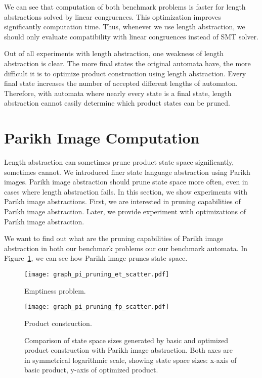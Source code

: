 We can see that computation of both benchmark problems is faster for length abstractions solved by linear congruences. This optimization improves significantly computation time. Thus, whenever we use length abstraction, we should only evaluate compatibility with linear congruences instead of SMT solver.

Out of all experiments with length abstraction, one weakness of length abstraction is clear. The more final states the original automata have, the more difficult it is to optimize product construction using length abstraction. Every final state increases the number of accepted different lengths of automaton. Therefore, with automata where nearly every state is a final state, length abstraction cannot easily determine which product states can be pruned.

\section{Parikh Image Computation}

Length abstraction can sometimes prune product state space significantly, sometimes cannot. We introduced finer state language abstraction using Parikh images. Parikh image abstraction should prune state space more often, even in cases where length abstraction fails. In this section, we show experiments with Parikh image abstractions. First, we are interested in pruning capabilities of Parikh image abstraction. Later, we provide experiment with optimizations of Parikh image abstraction.

We want to find out what are the pruning capabilities of Parikh image abstraction in both our benchmark problems our our benchmark automata. In Figure~\ref{fig:graph:pi_product_state_space_sizes_pruning_cap}, we can see how Parikh image prunes state space.
\begin{figure}[ht]
    \centering
    \begin{minipage}{0.49\linewidth}
        \centering
        \texttt{[image: graph\_pi\_pruning\_et\_scatter.pdf]}
        \caption{Emptiness problem.}
        \label{fig:graph:pi_et_state_space_sizes_comp}
    \end{minipage}
    \hfill
    \begin{minipage}{0.49\linewidth}
        \centering
        \texttt{[image: graph\_pi\_pruning\_fp\_scatter.pdf]}
        \caption{Product construction.}
        \label{fig:graph:pi_fp_state_space_sizes_comp}
    \end{minipage}
    \vspace{0.5cm}
    \caption{Comparison of state space sizes generated by basic and optimized product construction with Parikh image abstraction. Both axes are in symmetrical logarithmic scale, showing state space sizes: x-axis of basic product, y-axis of optimized product.}
    \label{fig:graph:pi_product_state_space_sizes_pruning_cap}
\end{figure}

